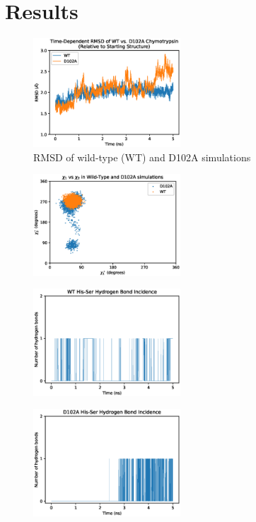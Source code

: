\documentclass[12pt, twocolumn]{article}
\begin{document}
\section{Results}



\begin{figure}[H]
    \centering
        \includegraphics[width=0.49\textwidth]{rmsds.eps}
    \caption{RMSD of wild-type (WT) and D102A simulations}
\end{figure}

\begin{figure}[H]
    \centering
        \includegraphics[width=0.49\textwidth]{chi_plot_wt_d102a.eps}
    \caption{}
\end{figure}

\begin{figure}[H]
    \centering
        \includegraphics[width=0.49\textwidth]{wt_hbonds_his_ser.eps}
    \caption{}
\end{figure}

\begin{figure}[H]
    \centering
        \includegraphics[width=0.49\textwidth]{d102a_hbonds_his_ser.eps}
    \caption{}
\end{figure}
\end{document}
